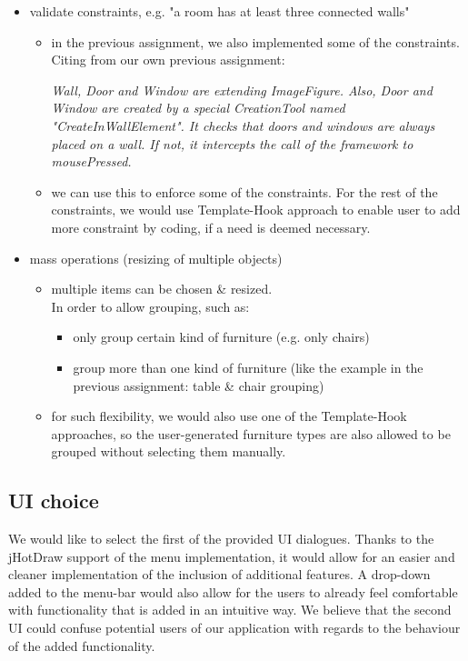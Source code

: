 \begin{itemize}
	\item validate constraints, e.g. "a room has at least three connected walls"
	\begin{itemize}
		\item in the previous assignment, we also implemented some of the constraints.\\
		Citing from our own previous assignment:
		
		\begin{addmargin}[4em]{0em}
			\textit{Wall, Door and Window are extending ImageFigure. Also, Door and Window are created by a special
				CreationTool named "CreateInWallElement". It checks that doors and windows are always placed on a
				wall. If not, it intercepts the call of the framework to mousePressed.}
		\end{addmargin}
		
		\item we can use this to enforce some of the constraints. For the rest of the constraints, we would use Template-Hook approach to enable user to add more constraint by coding, if a need is deemed necessary.
	\end{itemize}
	
	\item mass operations (resizing of multiple objects)
	\begin{itemize}
		\item multiple items can be chosen \& resized.\\
			In order to allow grouping, such as:
			\begin{itemize}
				\item only group certain kind of furniture (e.g. only chairs)
				\item group more than one kind of furniture (like the example in the previous assignment: table \& chair grouping)
			\end{itemize}
	
		\item for such flexibility, we would also use one of the Template-Hook approaches, so the user-generated furniture types are also allowed to be grouped without selecting them manually.
	\end{itemize}
\end{itemize}

\subsection{UI choice}

We would like to select the first of the provided UI dialogues. Thanks to the jHotDraw support of the menu implementation, it would allow for an easier and cleaner implementation of the inclusion of additional features. A drop-down added to the menu-bar would also allow for the users to already feel comfortable with functionality that is added in an intuitive way. We believe that the second UI could confuse potential users of our application with regards to the behaviour of the added functionality.

